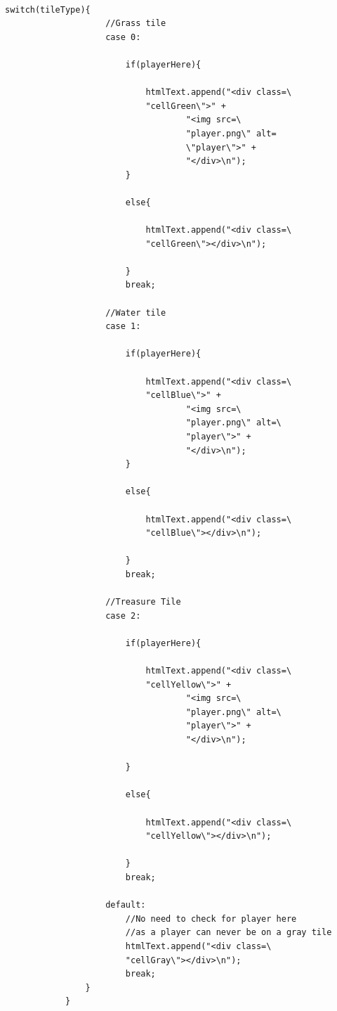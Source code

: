 \documentclass[a4paper,12pt]{extarticle}
\begin{document}
\newpage
\begin{lstlisting}

switch(tileType){
                    //Grass tile
                    case 0:

                        if(playerHere){

                            htmlText.append("<div class=\
                            "cellGreen\">" +
                                    "<img src=\
                                    "player.png\" alt=
                                    \"player\">" +
                                    "</div>\n");
                        }

                        else{

                            htmlText.append("<div class=\
                            "cellGreen\"></div>\n");

                        }
                        break;

                    //Water tile
                    case 1:

                        if(playerHere){

                            htmlText.append("<div class=\
                            "cellBlue\">" +
                                    "<img src=\
                                    "player.png\" alt=\
                                    "player\">" +
                                    "</div>\n");
                        }

                        else{

                            htmlText.append("<div class=\
                            "cellBlue\"></div>\n");

                        }
                        break;

                    //Treasure Tile
                    case 2:

                        if(playerHere){

                            htmlText.append("<div class=\
                            "cellYellow\">" +
                                    "<img src=\
                                    "player.png\" alt=\
                                    "player\">" +
                                    "</div>\n");

                        }

                        else{

                            htmlText.append("<div class=\
                            "cellYellow\"></div>\n");

                        }
                        break;

                    default:
                        //No need to check for player here
                        //as a player can never be on a gray tile
                        htmlText.append("<div class=\
                        "cellGray\"></div>\n");
                        break;
                }
            }

\end{lstlisting}
\vspace{4mm}
\end{document}
